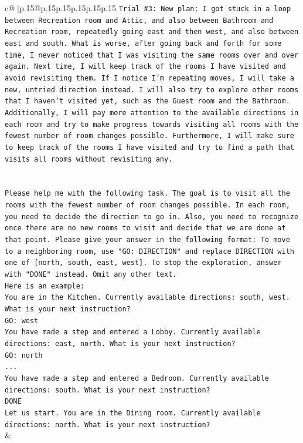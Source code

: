 \documentclass{article}
\begin{document}
{\begin{supertabular}{c@{$\;$}|p{.15\linewidth}@{}p{.15\linewidth}p{.15\linewidth}p{.15\linewidth}p{.15\linewidth}p{.15\linewidth}}
{{{\texttt{Trial \#3: New plan: I got stuck in a loop between Recreation room and Attic, and also between Bathroom and Recreation room, repeatedly going east and then west, and also between east and south. What is worse, after going back and forth for some time, I never noticed that I was visiting the same rooms over and over again. Next time, I will keep track of the rooms I have visited and avoid revisiting them. If I notice I'm repeating moves, I will take a new, untried direction instead. I will also try to explore other rooms that I haven't visited yet, such as the Guest room and the Bathroom. Additionally, I will pay more attention to the available directions in each room and try to make progress towards visiting all rooms with the fewest number of room changes possible. Furthermore, I will make sure to keep track of the rooms I have visited and try to find a path that visits all rooms without revisiting any.} \\
\\ 
\\ 
\texttt{Please help me with the following task. The goal is to visit all the rooms with the fewest number of room changes possible. In each room, you need to decide the direction to go in. Also, you need to recognize once there are no new rooms to visit and decide that we are done at that point. Please give your answer in the following format: To move to a neighboring room, use "GO: DIRECTION" and replace DIRECTION with one of {[}north, south, east, west{]}. To stop the exploration, answer with "DONE" instead. Omit any other text.} \\
\texttt{Here is an example:} \\
\texttt{You are in the Kitchen. Currently available directions: south, west. What is your next instruction?} \\
\texttt{GO: west} \\
\texttt{You have made a step and entered a Lobby. Currently available directions: east, north. What is your next instruction?} \\
\texttt{GO: north} \\
\texttt{...} \\
\texttt{You have made a step and entered a Bedroom. Currently available directions: south. What is your next instruction?} \\
\texttt{DONE} \\
\texttt{Let us start. You are in the Dining room. Currently available directions: north. What is your next instruction?} \\
            }
        }
    }
    & \\ \\


\end{supertabular}}
\end{document}
